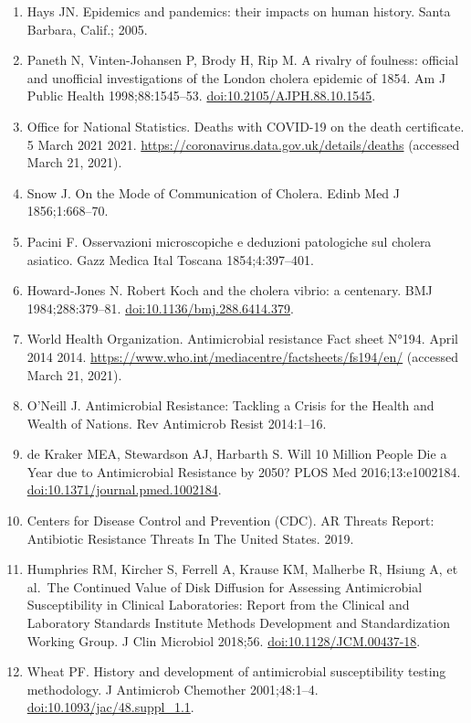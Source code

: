 \documentclass[
]{book}
\providecommand{\tightlist}{%
  \setlength{\itemsep}{0pt}\setlength{\parskip}{0pt}}
\begin{document}
\begin{enumerate}
\def\labelenumi{\arabic{enumi}.}
\tightlist
\item
  Hays JN. Epidemics and pandemics: their impacts on human history. Santa Barbara, Calif.; 2005.
\item
  Paneth N, Vinten-Johansen P, Brody H, Rip M. A rivalry of foulness: official and unofficial investigations of the London cholera epidemic of 1854. Am J Public Health 1998;88:1545--53. \url{doi:10.2105/AJPH.88.10.1545}.
\item
  Office for National Statistics. Deaths with COVID-19 on the death certificate. 5 March 2021 2021. \url{https://coronavirus.data.gov.uk/details/deaths} (accessed March 21, 2021).
\item
  Snow J. On the Mode of Communication of Cholera. Edinb Med J 1856;1:668--70.
\item
  Pacini F. Osservazioni microscopiche e deduzioni patologiche sul cholera asiatico. Gazz Medica Ital Toscana 1854;4:397--401.
\item
  Howard-Jones N. Robert Koch and the cholera vibrio: a centenary. BMJ 1984;288:379--81. \url{doi:10.1136/bmj.288.6414.379}.
\item
  World Health Organization. Antimicrobial resistance Fact sheet N°194. April 2014 2014. \url{https://www.who.int/mediacentre/factsheets/fs194/en/} (accessed March 21, 2021).
\item
  O'Neill J. Antimicrobial Resistance: Tackling a Crisis for the Health and Wealth of Nations. Rev Antimicrob Resist 2014:1--16.
\item
  de Kraker MEA, Stewardson AJ, Harbarth S. Will 10 Million People Die a Year due to Antimicrobial Resistance by 2050? PLOS Med 2016;13:e1002184. \url{doi:10.1371/journal.pmed.1002184}.
\item
  Centers for Disease Control and Prevention (CDC). AR Threats Report: Antibiotic Resistance Threats In The United States. 2019.
\item
  Humphries RM, Kircher S, Ferrell A, Krause KM, Malherbe R, Hsiung A, et al.~The Continued Value of Disk Diffusion for Assessing Antimicrobial Susceptibility in Clinical Laboratories: Report from the Clinical and Laboratory Standards Institute Methods Development and Standardization Working Group. J Clin Microbiol 2018;56. \url{doi:10.1128/JCM.00437-18}.
\item
  Wheat PF. History and development of antimicrobial susceptibility testing methodology. J Antimicrob Chemother 2001;48:1--4. \url{doi:10.1093/jac/48.suppl_1.1}.

\end{enumerate}
\end{document}
